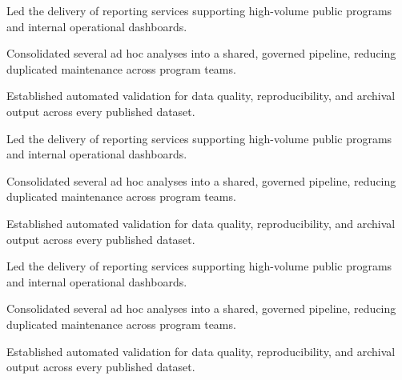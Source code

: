 \documentclass[fontsize=11pt, margin=narrow, medium=print]{careerdossier-resume}
\begin{document}
\MakeCDossierHeader

\begin{CDossierEntry}[title = {Principal Data Scientist}, organization = {Digital Services Laboratory}, location = {Ottawa, ON}, dates = {2024--Present}]
  \begin{CDossierItemize}
    \item Led the delivery of reporting services supporting high-volume public programs and internal operational dashboards.
    \item Consolidated several ad hoc analyses into a shared, governed pipeline, reducing duplicated maintenance across program teams.
    \item Established automated validation for data quality, reproducibility, and archival output across every published dataset.
  \end{CDossierItemize}
\end{CDossierEntry}
\begin{CDossierEntry}[title = {Senior Data Scientist}, organization = {Civic Technology Research Group}, location = {Toronto, ON}, dates = {2021--2024}]
  \begin{CDossierItemize}
    \item Led the delivery of reporting services supporting high-volume public programs and internal operational dashboards.
    \item Consolidated several ad hoc analyses into a shared, governed pipeline, reducing duplicated maintenance across program teams.
    \item Established automated validation for data quality, reproducibility, and archival output across every published dataset.
  \end{CDossierItemize}
\end{CDossierEntry}
\begin{CDossierEntry}[title = {Data Scientist}, organization = {Public Data Analytics Incorporated}, location = {Waterloo, ON}, dates = {2018--2021}]
  \begin{CDossierItemize}
    \item Led the delivery of reporting services supporting high-volume public programs and internal operational dashboards.
    \item Consolidated several ad hoc analyses into a shared, governed pipeline, reducing duplicated maintenance across program teams.
    \item Established automated validation for data quality, reproducibility, and archival output across every published dataset.
  \end{CDossierItemize}
\end{CDossierEntry}
\end{document}

